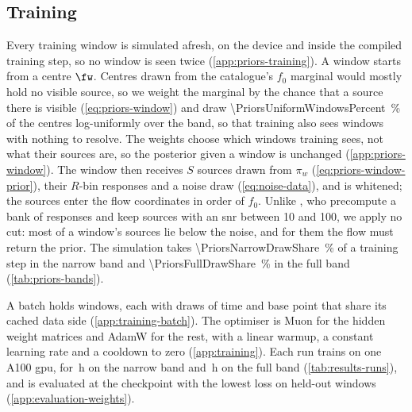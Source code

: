 \subsection{Training}
\label{sec:method-training}\label{sec:gw-training}

Every training window is simulated afresh, on the device and inside the compiled training step, so
no window is seen twice (\cref{app:priors-training}). A window starts from a centre $\fw$. Centres
drawn from the catalogue's $f_0$ marginal would mostly hold no visible source, so we weight the
marginal by the chance that a source there is visible (\cref{eq:priors-window}) and draw
\qty{\PriorsUniformWindowsPercent}{\percent} of the centres log-uniformly over the band, so that
training also sees windows with nothing to resolve. The weights choose which windows training sees,
not what their sources are, so the posterior given a window is unchanged (\cref{app:priors-window}).
The window then receives $S$ sources drawn from $\pi_w$ (\cref{eq:priors-window-prior}), their
$R$-bin responses and a noise draw (\cref{eq:noise-data}), and is whitened; the sources enter the
flow coordinates in order of $f_0$. Unlike \citet{delmond2026neural}, who precompute a bank of
responses and keep sources with an \ac{snr} between 10 and 100, we apply no cut: most of a window's
sources lie below the noise, and for them the flow must return the prior. The simulation takes
\qty{\PriorsNarrowDrawShare}{\percent} of a training step in the narrow band and
\qty{\PriorsFullDrawShare}{\percent} in the full band (\cref{tab:priors-bands}).

A batch holds \TrainingObservations{} windows, each with \TrainingDraws{} draws of time and base
point that share its cached data side (\cref{app:training-batch}). The optimiser is Muon
\citep{jordan2024muon,liu2025muon} for the hidden weight matrices and AdamW for the rest, with a
linear warmup, a constant learning rate and a cooldown to zero \citep{hagele2024scaling}
(\cref{app:training}). Each run trains on one A100 \ac{gpu}, for \ResultsNarrowHours\,h on the
narrow band and \ResultsFullHours\,h on the full band (\cref{tab:results-runs}), and is evaluated at
the checkpoint with the lowest loss on held-out windows (\cref{app:evaluation-weights}).
